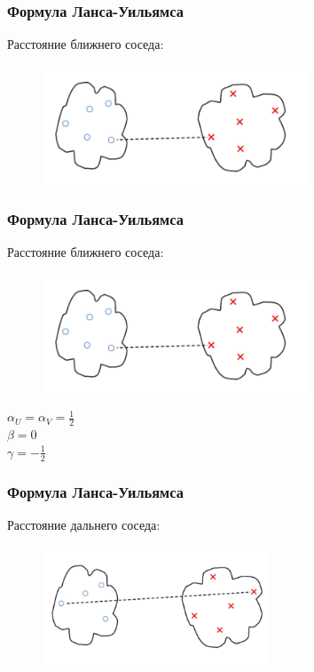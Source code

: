 \documentclass[12pt]{beamer}
\begin{document}
\begin{frame}\frametitle{Формула Ланса-Уильямса}
Расстояние ближнего соседа:\\
\begin{figure}[htbp]
  \includegraphics[height=100pt, keepaspectratio = true]{images/lans1}  
\end{figure}
\end{frame}

\begin{frame}\frametitle{Формула Ланса-Уильямса}
Расстояние ближнего соседа:\\
\begin{figure}[htbp]
  \includegraphics[height=100pt, keepaspectratio = true]{images/lans1}  
\end{figure}
${\alpha_U = \alpha_V = \frac{1}{2}}$ \\${\beta = 0}$ \\${\gamma = -\frac{1}{2}}$
\end{frame}

\begin{frame}\frametitle{Формула Ланса-Уильямса}
Расстояние дальнего соседа:\\
\begin{figure}[htbp]
  \includegraphics[height=100pt, keepaspectratio = true]{images/lans2}  
\end{figure}
\end{frame}
\end{document}
